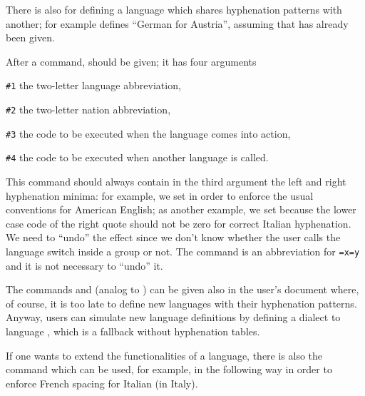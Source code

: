There is also {\tt{}} for defining a language which shares hyphenation
patterns with another; for example
 defines ``German for Austria'',
assuming that  has already been
given.

After a {\tt{}} command, {\tt{}} should be given; it has
four arguments

\nobreak\smallskip
\item{\tt\#1} the two-letter language abbreviation,

\item{\tt\#2} the two-letter nation abbreviation,

\item{\tt\#3} the code to be executed when the language comes into action,

\item{\tt\#4} the code to be executed when another language is called.
\smallskip

This command should always contain in the third argument the left and right hyphenation
minima: for example, we set
in order to enforce the usual conventions for American English; as another example, we set
because the lower case code of the right quote should not be zero for correct Italian
hyphenation. We need to ``undo'' the effect since we don't know whether the user calls the
language switch inside a group or not. The command
is an abbreviation for {\tt{}=x=y} and it is not
necessary to ``undo'' it.

The commands {\tt{}} and {\tt{}} (analog to
{\tt{}}) can be given also in the user's document where, of course, it is
too late to define new languages with their hyphenation patterns. Anyway, users can simulate
new language definitions by defining a dialect to language {\tt{}}, which is a
fallback without hyphenation tables.

If one wants to extend the functionalities of a language, there is also the command
which can be used, for example, in the following way
in order to enforce French spacing for Italian (in Italy).

